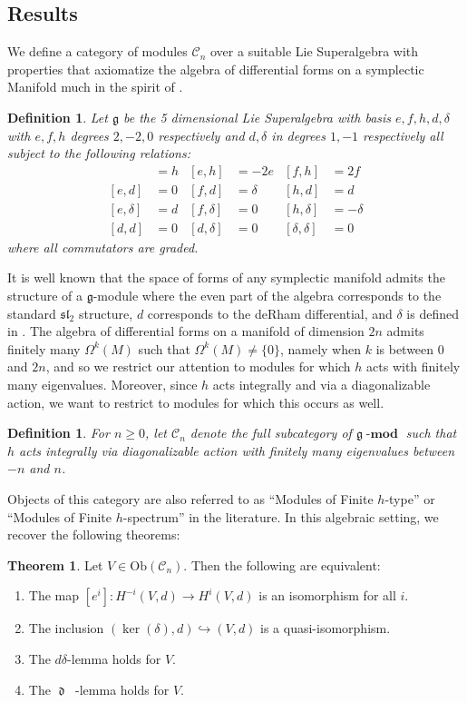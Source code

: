 \documentclass{amsart}
\newcommand{\ra}{\rightarrow}
\newtheorem{definition}[theorem]{Definition}
\DeclareMathOperator{\dee}{\mathfrak{d}}
\DeclareMathOperator{\deebar}{\overline{\mathfrak{d}}}
\theoremstyle{definition}
\newcommand{\lmod}{{\operatorname{\mathbf{-mod}}}}
\newtheorem*{theorem*}{Theorem}
\begin{document}
\subsection{Results}
We define a category of modules $\mathscr{C}_n$ over a suitable Lie Superalgebra with properties that axiomatize the algebra of differential forms on a symplectic Manifold much in the spirit of \cite{MR1480723}.
\begin{definition}
    Let $\mathfrak{g}$ be the 5 dimensional Lie Superalgebra with basis $e,f,h,d,\delta$ with $e,f,h$ degrees $2,-2,0$ respectively and $d,\delta$ in degrees $1,-1$ respectively
    all subject to the following relations:
    \begin{align*}
        [e,f]&=h & [e,h]&=-2e & [f,h]&=2f \\
        [e,d]&=0 & [f,d]&=\delta & [h,d]&=d \\
        [e,\delta]&=d & [f,\delta]&=0 & [h,\delta]&=-\delta  \\
        [d,d]&=0 & [d, \delta]&=0 & [\delta,\delta]&=0 
    \end{align*}
    where all commutators are graded.
\end{definition}
It is well known that the space of forms of any symplectic manifold admits the structure of a $\mathfrak{g}$-module where the even part of the algebra corresponds to the standard $\mathfrak{sl}_2$ structure, $d$ corresponds to the deRham differential, and $\delta$ is defined in \cite{BrylinskiPoisson}. The algebra of differential forms on a manifold of dimension $2n$ admits finitely many $\Omega^k(M)$ such that $\Omega^k(M) \neq \{0\}$, namely when $k$ is between $0$ and $2n$, and so we restrict our attention to modules for which $h$ acts with finitely many eigenvalues. Moreover, since $h$ acts integrally and via a diagonalizable action, we want to restrict to modules for which this occurs as well.
\begin{definition}
    For $n \geq 0$, let $\mathscr{C}_{n}$ denote the full subcategory of $\mathfrak{g}\lmod$ such that $h$ acts integrally via diagonalizable action with finitely many eigenvalues between $-n$ and $n$.
\end{definition}
 Objects of this category are also referred to as ``Modules of Finite $h$-type'' or ``Modules of Finite $h$-spectrum'' in the literature. In this algebraic setting, we recover the following theorems:
\begin{theorem*}
     Let $V \in \mathrm{Ob}(\mathscr{C}_n)$. Then the following are equivalent:
    \begin{enumerate}
        \item The map $[e^i]:H^{-i}(V,d) \ra H^i(V,d)$ is an isomorphism for all $i$.
        \item The inclusion $(\ker(\delta),d) \hookrightarrow (V,d)$ is a quasi-isomorphism.
         \item The $d\delta$-lemma holds for $V$.
        \item The $\dee \deebar$-lemma holds for $V$.
    \end{enumerate}
\end{theorem*}
\end{document}
